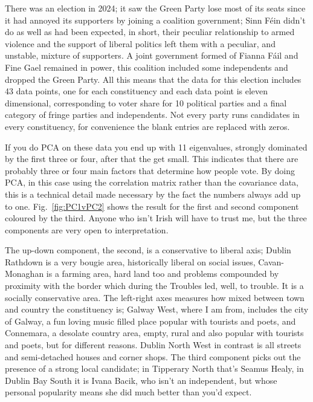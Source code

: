 \documentclass[12pt]{article}
\begin{document}
There was an election in 2024; it saw the Green Party lose most of its
seats since it had annoyed its supporters by joining a coalition
government; Sinn F\'{e}in didn't do as well as had been expected, in
short, their peculiar relationship to armed violence and the support
of liberal politics left them with a peculiar, and unstable, mixture
of supporters. A joint government formed of Fianna F\'{a}il and Fine
Gael remained in power, this coalition included some independents and
dropped the Green Party. All this means that the data for this
election includes 43 data points, one for each constituency and each
data point is eleven dimensional, corresponding to voter share for 10
political parties and a final category of fringe parties and
independents. Not every party runs candidates in every constituency,
for convenience the blank entries are replaced with zeros.

If you do PCA on these data you end up with 11 eigenvalues, strongly
dominated by the first three or four, after that the get small. This
indicates that there are probably three or four main factors that
determine how people vote. By doing PCA, in this case using the
correlation matrix rather than the covariance data, this is a
technical detail made necessary by the fact the numbers always add up
to one. Fig.~\ref{fig:PC1vPC2} shows the result for the first and
second component coloured by the third. Anyone who isn't Irish will
have to trust me, but the three components are very open to
interpretation.

The up-down component, the second, is a conservative to liberal axis;
Dublin Rathdown is a very bougie area, historically liberal on social
issues, Cavan-Monaghan is a farming area, hard land too and problems
compounded by proximity with the border which during the Troubles led,
well, to trouble. It is a socially conservative area. The left-right
axes measures how mixed between town and country the constituency is;
Galway West, where I am from, includes the city of Galway, a fun
loving music filled place popular with tourists and poets, and
Connemara, a desolate country area, empty, rural and also popular with
tourists and poets, but for different reasons. Dublin North West in
contrast is all streets and semi-detached houses and corner shops. The
third component picks out the presence of a strong local candidate; in
Tipperary North that's Seamus Healy, in Dublin Bay South it is Ivana
Bacik, who isn't an independent, but whose personal popularity means
she did much better than you'd expect.
\end{document}
